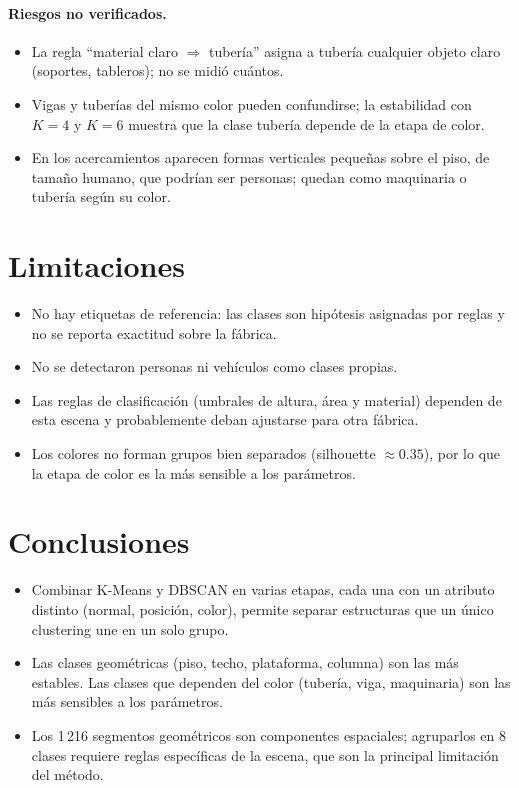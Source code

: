 \documentclass[11pt,a4paper]{article}
\begin{document}
\paragraph{Riesgos no verificados.}
\begin{itemize}
  \item La regla ``material claro $\Rightarrow$ tubería'' asigna a tubería
        cualquier objeto claro (soportes, tableros); no se midió cuántos.
  \item Vigas y tuberías del mismo color pueden confundirse; la estabilidad
        con $K=4$ y $K=6$ muestra que la clase tubería depende de la etapa de
        color.
  \item En los acercamientos aparecen formas verticales pequeñas sobre el piso,
        de tamaño humano, que podrían ser personas; quedan como maquinaria o
        tubería según su color.
\end{itemize}

\section{Limitaciones}
\begin{itemize}
  \item No hay etiquetas de referencia: las clases son hipótesis asignadas por
        reglas y no se reporta exactitud sobre la fábrica.
  \item No se detectaron personas ni vehículos como clases propias.
  \item Las reglas de clasificación (umbrales de altura, área y material)
        dependen de esta escena y probablemente deban ajustarse para otra
        fábrica.
  \item Los colores no forman grupos bien separados (silhouette
        $\approx 0.35$), por lo que la etapa de color es la más sensible a los
        parámetros.
\end{itemize}

\section{Conclusiones}
\begin{itemize}
  \item Combinar K-Means y DBSCAN en varias etapas, cada una con un atributo
        distinto (normal, posición, color), permite separar estructuras que un
        único clustering une en un solo grupo.
  \item Las clases geométricas (piso, techo, plataforma, columna) son las más
        estables. Las clases que dependen del color (tubería, viga,
        maquinaria) son las más sensibles a los parámetros.
  \item Los 1\,216 segmentos geométricos son componentes espaciales; agruparlos
        en 8 clases requiere reglas específicas de la escena, que son la
        principal limitación del método.
\end{itemize}
\end{document}
